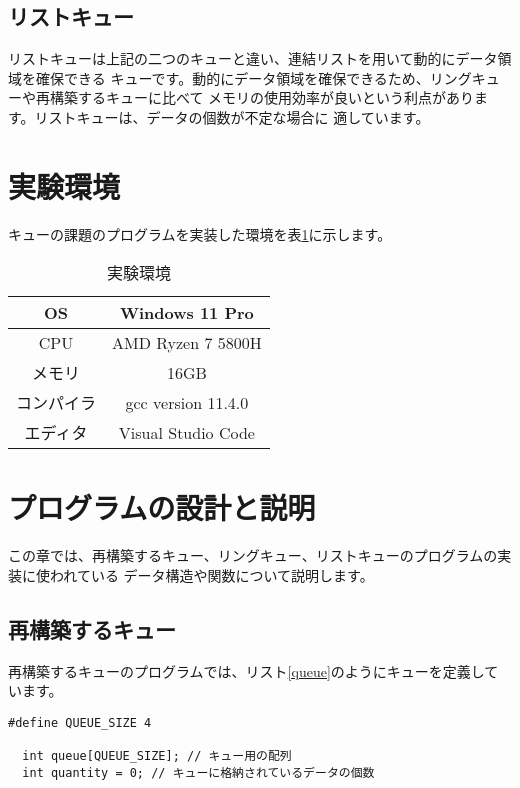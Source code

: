 \documentclass[a4j]{jarticle}
\begin{document}
\subsection{リストキュー}
リストキューは上記の二つのキューと違い、連結リストを用いて動的にデータ領域を確保できる
キューです。動的にデータ領域を確保できるため、リングキューや再構築するキューに比べて
メモリの使用効率が良いという利点があります。リストキューは、データの個数が不定な場合に
適しています。

\section{実験環境}
キューの課題のプログラムを実装した環境を表\ref{table:environment}に示します。
\begin{table}
  \centering
  \caption{実験環境}
  \label{table:environment}
  \begin{tabular}{|c|c|}
    \hline
    OS    & Windows 11 Pro     \\
    \hline
    CPU   & AMD Ryzen 7 5800H  \\
    \hline
    メモリ   & 16GB               \\
    \hline
    コンパイラ & gcc version 11.4.0 \\
    \hline
    エディタ  & Visual Studio Code \\
    \hline
  \end{tabular}
\end{table}

\section{プログラムの設計と説明}
この章では、再構築するキュー、リングキュー、リストキューのプログラムの実装に使われている
データ構造や関数について説明します。

\subsection{再構築するキュー}
再構築するキューのプログラムでは、リスト\ref{queue}のようにキューを定義しています。
\begin{lstlisting}[caption=再構築するキュープログラムのキューの定義,label=queue]
  #define QUEUE_SIZE 4

  int queue[QUEUE_SIZE]; // キュー用の配列
  int quantity = 0; // キューに格納されているデータの個数
\end{lstlisting}
\end{document}

